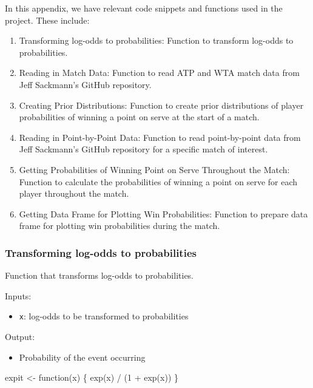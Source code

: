 \documentclass[
  letterpaper,
  DIV=11,
  numbers=noendperiod]{scrartcl}
\newenvironment{Shaded}{\begin{snugshade}}{\end{snugshade}}
\newcommand{\ControlFlowTok}[1]{\textcolor[rgb]{0.00,0.23,0.31}{#1}}
\newcommand{\DecValTok}[1]{\textcolor[rgb]{0.68,0.00,0.00}{#1}}
\newcommand{\FunctionTok}[1]{\textcolor[rgb]{0.28,0.35,0.67}{#1}}
\newcommand{\NormalTok}[1]{\textcolor[rgb]{0.00,0.23,0.31}{#1}}
\newcommand{\OtherTok}[1]{\textcolor[rgb]{0.00,0.23,0.31}{#1}}
\newcommand{\SpecialCharTok}[1]{\textcolor[rgb]{0.37,0.37,0.37}{#1}}
\providecommand{\tightlist}{%
  \setlength{\itemsep}{0pt}\setlength{\parskip}{0pt}}\usepackage{longtable,booktabs,array}
\begin{document}
In this appendix, we have relevant code snippets and functions used in
the project. These include:

\begin{enumerate}
\def\labelenumi{\arabic{enumi}.}
\tightlist
\item
  Transforming log-odds to probabilities: Function to transform log-odds
  to probabilities.
\item
  Reading in Match Data: Function to read ATP and WTA match data from
  Jeff Sackmann's GitHub repository.
\item
  Creating Prior Distributions: Function to create prior distributions
  of player probabilities of winning a point on serve at the start of a
  match.
\item
  Reading in Point-by-Point Data: Function to read point-by-point data
  from Jeff Sackmann's GitHub repository for a specific match of
  interest.
\item
  Getting Probabilities of Winning Point on Serve Throughout the Match:
  Function to calculate the probabilities of winning a point on serve
  for each player throughout the match.
\item
  Getting Data Frame for Plotting Win Probabilities: Function to prepare
  data frame for plotting win probabilities during the match.
\end{enumerate}

\subsubsection{Transforming log-odds to
probabilities}\label{transforming-log-odds-to-probabilities}

Function that transforms log-odds to probabilities.

Inputs:

\begin{itemize}
\tightlist
\item
  \texttt{x}: log-odds to be transformed to probabilities
\end{itemize}

Output:

\begin{itemize}
\tightlist
\item
  Probability of the event occurring
\end{itemize}

\linespread{0.9}

\begin{Shaded}
\begin{Highlighting}[]
\NormalTok{expit }\OtherTok{\textless{}{-}} \ControlFlowTok{function}\NormalTok{(x) \{}
  \FunctionTok{exp}\NormalTok{(x) }\SpecialCharTok{/}\NormalTok{ (}\DecValTok{1} \SpecialCharTok{+} \FunctionTok{exp}\NormalTok{(x))}
\NormalTok{\}}
\end{Highlighting}
\end{Shaded}
\end{document}
